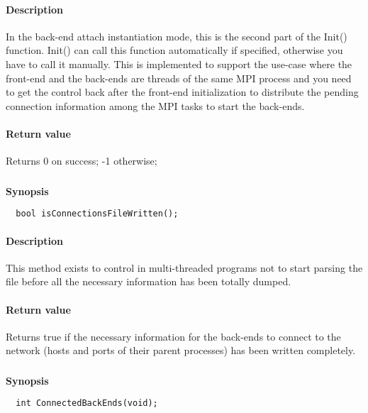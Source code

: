 \documentclass[twoside,a4,english,11pt]{book}
\begin{document}
\paragraph{Description}
  In the back-end attach instantiation mode, this is the second part of the Init() function. 
  Init() can call this function automatically if specified, otherwise you have to 
  call it manually. This is implemented to support the use-case where the front-end and
  the back-ends are threads of the same MPI process and you need to get the control back after
  the front-end initialization to distribute the pending connection information among the 
  MPI tasks to start the back-ends. 

\paragraph{Return value}
  Returns 0 on success; -1 otherwise;

\subsubsection{} 

\textbf{Synopsis}
\begin{lstlisting}
  bool isConnectionsFileWritten();
\end{lstlisting}

\paragraph{Description}
  This method exists to control in multi-threaded programs not to start parsing the file 
  before all the necessary information has been totally dumped. 
  
\paragraph{Return value}
  Returns true if the necessary information for the back-ends to connect to the network 
  (hosts and ports of their parent processes) has been written completely. 
  

\subsubsection{} 

\textbf{Synopsis}
\begin{lstlisting}
  int ConnectedBackEnds(void);
\end{lstlisting}
\end{document}
